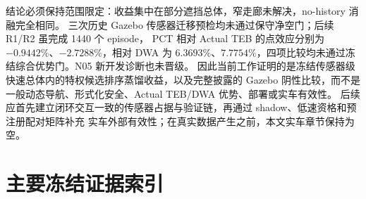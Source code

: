 \documentclass[12pt,a4paper,oneside]{report}
\begin{document}
结论必须保持范围限定：收益集中在部分遮挡总体，窄走廊未解决，no-history 消融完全相同。
三次历史 Gazebo 传感器迁移预检均未通过保守净空门；后续 R1/R2 虽完成 1440 个 episode，
PCT 相对 Actual TEB 的点效应分别为 $-0.9442\%$、$-2.7288\%$，相对 DWA 为
$6.3693\%$、$7.7754\%$，四项比较均未通过冻结综合优势门。N05 新开发诊断也未晋级。
因此当前工作证明的是冻结传感器级快速总体内的特权候选排序蒸馏收益，以及完整披露的
Gazebo 阴性比较，而不是一般动态导航、形式化安全、Actual TEB/DWA 优势、部署或实车有效性。
后续应首先建立闭环交互一致的传感器占据与验证链，再通过 shadow、低速资格和预注册配对矩阵补充
实车外部有效性；在真实数据产生之前，本文实车章节保持为空。

\appendix
\chapter{主要冻结证据索引}
\end{document}
